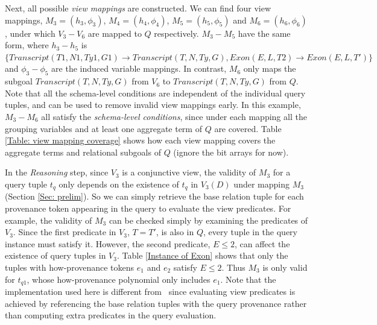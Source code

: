 \begin{example}
Next, all possible {\em view mappings} are constructed. We can find four view mappings, $M_3=(h_3,\phi_3)$, $M_4=(h_4, \phi_4)$, $M_5=(h_5, \phi_5)$ and $M_6=(h_6, \phi_6)$, under which $V_3-V_6$ are mapped to $Q$ respectively. $M_3-M_5$ have the same form, where $h_3-h_5$ is $\{Transcript(T1, N1, Ty1, G1) \rightarrow Transcript(T, N, Ty, G), Exon(E, L, T2)\rightarrow Exon(E, L, T')\}$ and $\phi_3-\phi_5$ are the induced variable mappings. In contrast, $M_6$ only maps the subgoal $Transcript(T, N, Ty, G)$ from $V_6$ to $Transcript(T, N, Ty, G)$ from $Q$. Note that all the {schema-level conditions} are independent of the individual query tuples, and can be used to remove invalid view mappings early. In this example, $M_3-M_6$ all satisfy the {\em schema-level conditions}, since under each mapping all the grouping variables and at least one aggregate term of $Q$ are {covered}. Table \ref{Table: view mapping coverage} shows how each view mapping covers the aggregate terms and relational subgoals of $Q$ (ignore the bit arrays for now).

In the {\em Reasoning} step, since $V_3$ is a {conjunctive view}, the validity of $M_3$ for a query tuple $t_q$ only depends on the {existence} of $t_q$ in $V_3(D)$ under mapping $M_3$ (Section \ref{Sec: prelim}). So we can simply retrieve the base relation tuple for each provenance token appearing in the query to evaluate the view {predicates}. For example, the validity of $M_3$ can be checked simply by examining the predicates of $V_3$. Since the first predicate in $V_3$, $T = T'$, is also in $Q$, every tuple in the query instance must satisfy it. However, the second predicate, $E \leq 2$, can affect the {existence} of query tuples in $V_3$. Table \ref{Instance of Exon} shows that only the tuples with how-provenance tokens $e_1$ and $e_2$ satisfy $E \leq 2$. Thus $M_3$ is only valid for $t_{{q}1}$, whose how-provenance polynomial only includes $e_1$. %
{Note that the implementation used here is different from \rba\ since evaluating view predicates is achieved by {referencing the base relation tuples with the query provenance} rather than computing extra predicates in the query evaluation.}  


\end{example}
